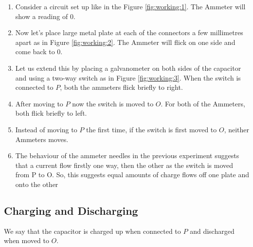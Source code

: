 			\begin{enumerate}
				\tightlist
				\item Consider a circuit set up like in the Figure \ref{fig:working:1}. The Ammeter will show a reading of $0$.
				\item Now let’s place large metal plate at each of the connectors a few millimetres apart as in Figure \ref{fig:working:2}. The Ammeter will flick on one side and come back to $0$.
				\item Let us extend this by placing a galvanometer on both sides of the capacitor and using a two-way switch as in Figure \ref{fig:working:3}. When the switch is connected to $P$, both the ammeters flick briefly to right.
				\item After moving to $P$ now the switch is moved to $O$. For both of the Ammeters, both flick briefly to left.
				\item Instead of moving to $P$ the first time, if the switch is first moved to $O$, neither Ammeters moves.
				\item The behaviour of the ammeter needles in the previous experiment suggests that a current flow firstly one way, then the other as the switch is moved from P to O. So, this suggests equal amounts of charge flows off one plate and onto the other
			\end{enumerate}							
			
		\subsection{Charging and Discharging}
			We say that the capacitor is charged up when connected to $P$ and discharged when moved to $O$.
			
